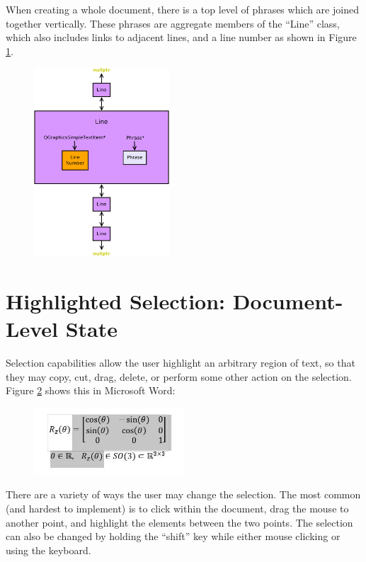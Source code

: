 \documentclass[12pt]{article}
\begin{document}
When creating a whole document, there is a top level of phrases which are joined together vertically.
These phrases are aggregate members of the ``Line'' class, which also includes links to adjacent lines, and a line number as shown in Figure \ref{fig:line}.

\begin{figure}[ht]
	\centering
		\includegraphics[width=0.45\textwidth]{Fig/Line.pdf}
	\caption{}
	\label{fig:line}
\end{figure}

\section{Highlighted Selection: Document-Level State}

Selection capabilities allow the user highlight an arbitrary region of text, so that they may copy, cut, drag, delete, or perform some other action on the selection. Figure \ref{fig:complex_selection} shows this in Microsoft Word:
\begin{figure}[ht]
	\centering
		\includegraphics[width=0.50\textwidth]{Fig/ComplexSelection.jpg}
	\caption{}
	\label{fig:complex_selection}
\end{figure}

There are a variety of ways the user may change the selection. The most common (and hardest to implement) is to click within the document, drag the mouse to another point, and highlight the elements between the two points. The selection can also be changed by holding the ``shift'' key while either mouse clicking or using the keyboard.
\end{document}
